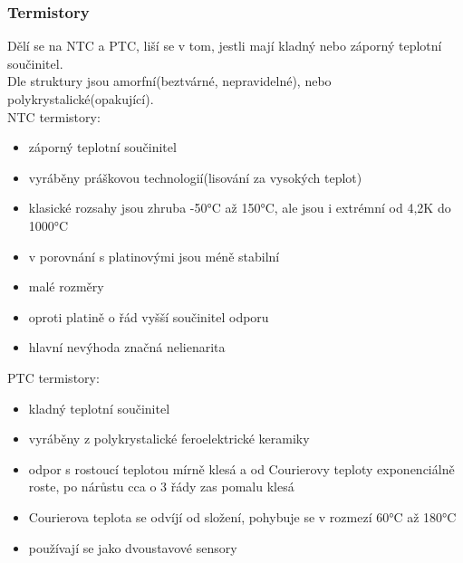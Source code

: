 \subsubsection*{Termistory}
Dělí se na NTC a PTC, liší se v tom, jestli mají kladný nebo záporný teplotní součinitel.\\
Dle struktury jsou amorfní(beztvárné, nepravidelné), nebo polykrystalické(opakující).\\
NTC termistory:
\begin{itemize}
    \item záporný teplotní součinitel
    \item vyráběny práškovou technologií(lisování za vysokých teplot)
    \item klasické rozsahy jsou zhruba -50°C až 150°C, ale jsou i extrémní od 4,2K do 1000°C
    \item v porovnání s platinovými jsou méně stabilní
    \item malé rozměry
    \item oproti platině o řád vyšší součinitel odporu
    \item hlavní nevýhoda značná nelienarita
\end{itemize}
PTC termistory:
\begin{itemize}
    \item kladný teplotní součinitel
    \item vyráběny z polykrystalické feroelektrické keramiky
    \item odpor s rostoucí teplotou mírně klesá a od Courierovy teploty exponenciálně roste, po nárůstu cca o 3 řády zas pomalu klesá
    \item Courierova teplota se odvíjí od složení, pohybuje se v rozmezí 60°C až 180°C
    \item používají se jako dvoustavové sensory
\end{itemize}
\newpage

